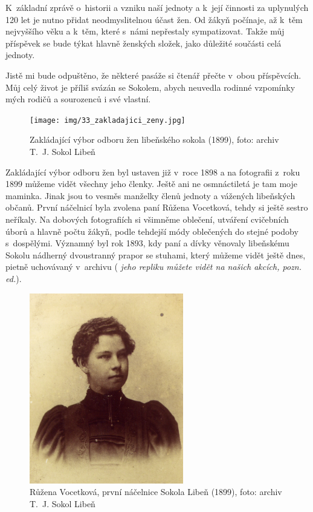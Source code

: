 \documentclass[a5paper, 11pt, twoside]{article}
\newcommand{\pozned}[1]{%
\textit{#1}}
\begin{document}
K~základní zprávě o~historii a vzniku naší jednoty a k~její činnosti za
uplynulých 120 let je nutno přidat neodmyslitelnou účast žen. Od žákyň
počínaje, až k~těm nejvyššího věku a k~těm, které s~námi nepřestaly
sympatizovat. Takže můj příspěvek se bude týkat hlavně ženských složek,
jako důležité součásti celá jednoty.

Jistě mi bude odpuštěno, že některé pasáže si čtenář přečte v~obou
příspěvcích. Můj celý život je příliš svázán se Sokolem, abych neuvedla
rodinné vzpomínky mých rodičů a sourozenců i své vlastní.

\begin{figure}[h!]
  \centering 
  \texttt{[image: img/33\_zakladajici\_zeny.jpg]}
  \caption*{Zakládající výbor odboru žen libeňského sokola (1899), foto:
  archiv T.~J. Sokol Libeň}
\end{figure}

Zakládající výbor odboru žen byl ustaven již v~roce 1898 a na fotografii
z~roku 1899 můžeme vidět všechny jeho členky. Ještě ani ne osmnáctiletá
je tam moje maminka. Jinak jsou to vesměs manželky členů jednoty a
vážených libeňských občanů. První náčelnicí byla zvolena paní Růžena
Vocetková, tehdy si ještě sestro neříkaly. Na dobových fotografiích si
všimněme oblečení, utváření cvičebních úborů a hlavně počtu žákyň, podle
tehdejší módy oblečených do stejné podoby s~dospělými. Významný byl rok
1893, kdy paní a dívky věnovaly libeňskému Sokolu nádherný dvoustranný
prapor se stuhami, který můžeme vidět ještě dnes, pietně uchovávaný
v~archivu (\pozned{jeho repliku můžete vidět na našich akcích, pozn. ed.}).

\begin{figure}[h!]
  \centering 
  \includegraphics[width=0.6\textwidth]{img/34_vocetkova_nacelnice.jpg}
  \caption*{Růžena Vocetková, první náčelnice Sokola Libeň (1899), foto:
  archiv T.~J. Sokol Libeň}
\end{figure}
\end{document}
